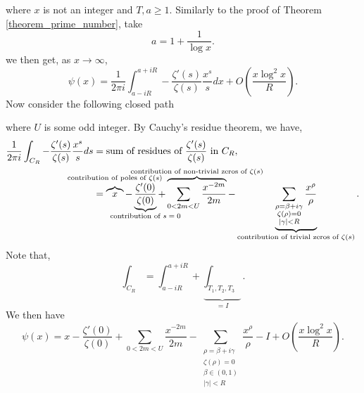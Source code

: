 \documentclass{article}
\begin{document}
where $x$ is not an integer and $T,a\geq1$. Similarly to the proof of Theorem \ref{theorem_prime_number}, take 
\begin{equation*}
  a=1+{\frac 1 {\log x}}.
\end{equation*}
we then get, as $x\to\infty$,
\begin{equation*}
  \psi(x) = {\frac 1 {2\pi i}}\int_{a-iR}^{a+iR}-{\frac {\zeta'(s)}{\zeta(s)}}{\frac {x^s} s}dx+O\left({\frac {x\log^2x}{R}}\right).
\end{equation*}
Now consider the following closed path
\begin{center}
\end{center}
where $U$ is some odd integer. By Cauchy's residue theorem, we have,
\begin{align*}
   {\frac 1 {2\pi i}}\int_{C_R}-{\frac {\zeta'(s)}{\zeta(s)}}{\frac {x^s} s}ds &= \text{sum of residues of ${\frac {\zeta'(s)}{\zeta(s)}}$ in $C_R$},\\
   & = \overbrace{x}^{\substack{\text{\makebox[0pt][c]{contribution of poles of $\zeta(s)$}}\\\:}} - \underbrace{{\frac {\zeta'(0)}{\zeta(0)}}}_{\text{\makebox[0pt][c]{contribution of $s=0$}}} +\overbrace{\sum_{0<2m<U}{\frac {x^{-2m}} {2m}}}^{\text{\makebox[0pt][c]{contribution of non-trivial zeros of $\zeta(s)$}}}-\underbrace{\sum_{\substack{\rho=\beta+i\gamma\\\zeta(\rho)=0\\\vert\gamma\vert<R}}{\frac {x^\rho} {\rho}}}_{\text{contribution of trivial zeros of $\zeta(s)$}}.
\end{align*}
Note that,
\begin{equation*}
  \int_{C_R}=\int_{a-iR}^{a+iR}+\underbrace{\int_{T_1,T_2,T_3}}_{=I}.
\end{equation*}
We then have %
\begin{equation*}
  \psi(x) = x-{\frac {\zeta'(0)} {\zeta(0)}}+\sum_{0<2m<U}{\frac {x^{-2m}} {2m}}-\sum_{\substack{\rho=\beta+i\gamma\\\zeta(\rho)=0\\\beta\in(0,1)\\\vert\gamma\vert<R}}{\frac {x^\rho} {\rho}}-I+O\left({\frac {x\log^2x}{R}}\right).
\end{equation*}
\end{document}
